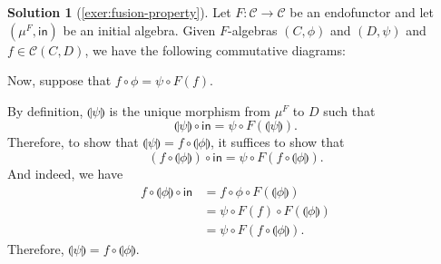 \documentclass[a4paper,11pt, oneside,titlepage=false]{scrbook}
\theoremstyle{plain}
\theoremstyle{definition}
\newtheorem{solution}[thm]{Solution}
\newcommand{\Cat}[1]{\mathcal{#1}}
\newcommand{\CC}{\Cat{C}}
\newcommand{\CHom}[3]{{#1}(#2,#3)}
\newcommand{\Initalg}[1]{\ensuremath{\mu^{#1}}}
\newcommand{\catam}[1]{\llparenthesis #1 \rrparenthesis}
\newcommand{\In}{\ensuremath{\mathsf{in}}}
\begin{document}
\begin{solution}[\cref{exer:fusion-property}]\label{sol:fusion-property}
	Let $ F : \CC \to \CC $ be an endofunctor and let $ (\Initalg F, \In) $ be an initial algebra. Given $F$-algebras $(C,\phi)$ and $(D,\psi)$ and $ f \in \CHom{\CC}{C}{D} $, we have the following commutative diagrams:
	\begin{center}
		\quad
	\end{center}
	Now, suppose that $ f \circ \phi = \psi \circ F(f) $.

	By definition, $ \catam \psi $ is the unique morphism from $ \Initalg F $ to $ D $ such that
	\[ \catam{\psi} \circ \In = \psi \circ F(\catam{\psi}). \]
	Therefore, to show that $ \catam \psi = f \circ \catam \phi $, it suffices to show that
	\[ (f \circ \catam{\phi}) \circ \In = \psi \circ F(f \circ \catam{\phi}). \]
	And indeed, we have
	\begin{align*}
		f \circ \catam{\phi} \circ \In &= f \circ \phi \circ F(\catam{\phi})\\
		&= \psi \circ F(f) \circ F(\catam{\phi})\\
		&= \psi \circ F(f \circ \catam{\phi}).
	\end{align*}
	Therefore, $ \catam{\psi} = f \circ \catam{\phi} $.
\end{solution}
\end{document}
